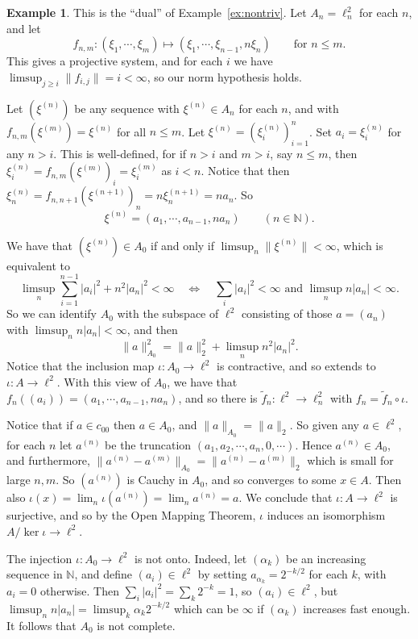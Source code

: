\documentclass[a4paper,11pt]{article}
\theoremstyle{definition}
\newtheorem{example}[lemma]{Example}
\begin{document}
\begin{example}
This is the ``dual'' of Example~\ref{ex:nontriv}.  Let $A_n = \ell^2_n$ for each $n$, and let
\[ f_{n,m} \colon (\xi_1,\cdots,\xi_m) \mapsto (\xi_1,\cdots,\xi_{n-1},n\xi_n)
\qquad\text{for }n\leq m. \]
This gives a projective system, and for each $i$ we have $\limsup_{j\geq i} \|f_{i,j}\| = i < \infty$, so our norm hypothesis holds.

Let $(\xi^{(n)})$ be any sequence with $\xi^{(n)}\in A_n$ for each $n$, and with $f_{n,m}(\xi^{(m)}) = \xi^{(n)}$ for all $n\leq m$.  Let $\xi^{(n)} = (\xi^{(n)}_i)_{i=1}^n$.  Set $a_i = \xi^{(n)}_i$ for any $n>i$.  This is well-defined, for if $n>i$ and $m>i$, say $n\leq m$, then $\xi^{(n)}_i = f_{n,m}(\xi^{(m)})_i = \xi^{(m)}_i$ as $i<n$.  Notice that then $\xi^{(n)}_n = f_{n,n+1}(\xi^{(n+1)})_n = n \xi^{(n+1)}_n = n a_n$.  So
\[ \xi^{(n)} = (a_1,\cdots,a_{n-1},na_n) \qquad (n\in\mathbb N). \]

We have that $(\xi^{(n)}) \in A_0$ if and only if $\limsup_n \|\xi^{(n)}\| < \infty$, which is equivalent to
\[ \limsup_n \sum_{i=1}^{n-1} |a_i|^2 + n^2|a_n|^2 < \infty
\quad\iff\quad
\sum_i |a_i|^2<\infty \text{ and } \limsup_n n|a_n|<\infty. \]
So we can identify $A_0$ with the subspace of $\ell^2$ consisting of those $a=(a_n)$ with $\limsup_n n|a_n|<\infty$, and then
\[ \|a\|_{A_0}^2 = \|a\|^2_2 + \limsup_n n^2|a_n|^2. \]
Notice that the inclusion map $\iota \colon A_0 \to \ell^2$ is contractive, and so extends to $\iota \colon A\to\ell^2$.  With this view of $A_0$, we have that $f_n((a_i)) = (a_1,\cdots,a_{n-1},na_n)$, and so there is $\tilde f_n \colon \ell^2 \to \ell^2_n$ with $f_n = \tilde f_n\circ\iota$.

Notice that if $a\in c_{00}$ then $a\in A_0$, and $\|a\|_{A_0} = \|a\|_2$.  So given any $a\in\ell^2$, for each $n$ let $a^{(n)}$ be the truncation $(a_1,a_2,\cdots,a_n,0,\cdots)$.  Hence $a^{(n)} \in A_0$, and furthermore, $\| a^{(n)} - a^{(m)} \|_{A_0} = \| a^{(n)} - a^{(m)} \|_2$ which is small for large $n,m$.  So $(a^{(n)})$ is Cauchy in $A_0$, and so converges to some $x\in A$.  Then also $\iota(x) = \lim_n \iota(a^{(n)}) = \lim_n a^{(n)} = a$.  We conclude that $\iota \colon A \to \ell^2$ is surjective, and so by the Open Mapping Theorem, $\iota$ induces an isomorphism $A/\ker\iota \to \ell^2$.

The injection $\iota \colon A_0 \to \ell^2$ is not onto.   Indeed, let $(\alpha_k)$ be an increasing sequence in $\mathbb N$, and define $(a_i)\in\ell^2$ by setting $a_{\alpha_k} = 2^{-k/2}$ for each $k$, with $a_i=0$ otherwise.  Then $\sum_i |a_i|^2 = \sum_k 2^{-k} = 1$, so $(a_i)\in\ell^2$, but $\limsup_n n|a_n| = \limsup_k \alpha_k 2^{-k/2}$ which can be $\infty$ if $(\alpha_k)$ increases fast enough.  It follows that $A_0$ is not complete.


\end{example}
\end{document}
